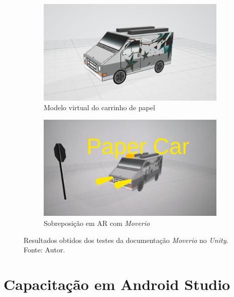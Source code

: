 \begin{figure}[ht]
    \centering
        \begin{subfigure}{.45\textwidth}
            \centering
            \includegraphics[width=.95\textwidth]{figuras/PaperCar.png}
            \caption{Modelo virtual do carrinho de papel}
            \label{fig:papercar-stl}
        \end{subfigure}
        \begin{subfigure}{.45\textwidth}
            \centering
            \includegraphics[width=.95\textwidth]{figuras/PaperCarAR.png}
            \caption{Sobreposição em AR com \textit{Moverio}}
            \label{fig:papercar-ar}
        \end{subfigure}
        \caption{Resultados obtidos dos testes da documentação \textit{Moverio} no \textit{Unity}. Fonte: Autor.}
        \label{fig:papercar-tests}
\end{figure}

\section{Capacitação em Android Studio}

